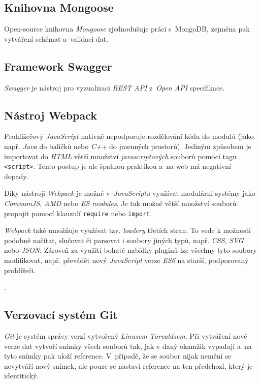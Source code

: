 \documentclass[a4paper,12pt]{article}
\def\code#1{\texttt{#1}}
\begin{document}
\subsection{Knihovna Mongoose}
Open-source knihovna \textit{Mongoose} zjednodušuje práci s~MongoDB, zejména pak vytváření schémat a~validaci dat.~\cite{mongomongoose}

\subsection{Framework Swagger}
\textit{Swagger} je nástroj pro vyzualizaci \textit{REST API} z~\textit{Open API} specifikace.

\subsection{Nástroj Webpack}
Prohlížečový \textit{JavaScript} nativně nepodporuje rozdělování kódu do modulů (jako např. \textit{Java} do balíčků nebo \textit{C++} do jmenných prostorů). Jediným způsobem je importovat do \textit{HTML} větší množství \textit{javascriptových} souborů pomocí tagu \code{<script>}. Tento postup je ale špatnou praktikou a~na web má negativní dopady.~\cite{jsconcat}

Díky nástroji \textit{Webpack} je možné v~\textit{JavaScriptu} využívat modulární systémy jako \textit{CommonJS}, \textit{AMD} nebo \textit{ES modules}. Je tak možné větší množství souborů propojit pomocí klauzulí \code{require} nebo \code{import}.~\cite{webpack}

\textit{Webpack} také umožňuje využívat tzv. \textit{loadery} třetích stran. To vede k možnosti podobně načítat, slučovat či parsovat i soubory jiných typů, např. \textit{CSS}, \textit{SVG} nebo \textit{JSON}. Zároveň za využití bohaté nabídky pluginů lze všechny tyto soubory modifikovat, např. převádět nový \textit{JavaScript} verze \textit{ES6} na starší, podporovaný prohlížeči.~\cite{webpack}

.

\subsection{Verzovací systém Git}

\textit{Git} je systém správy verzí vytvořený \textit{Linusem Torvaldsem}. Při vytváření nové verze dat vytvoří snímky všech souborů tak, jak v daný okamžik vypadají a~na tyto snímky pak uloží reference. V~případě, že se soubor nijak nemění se nevytváří nový snímek, ale pouze se nastaví reference na ten předchozí, který je identitický.~\cite{git}
\end{document}
